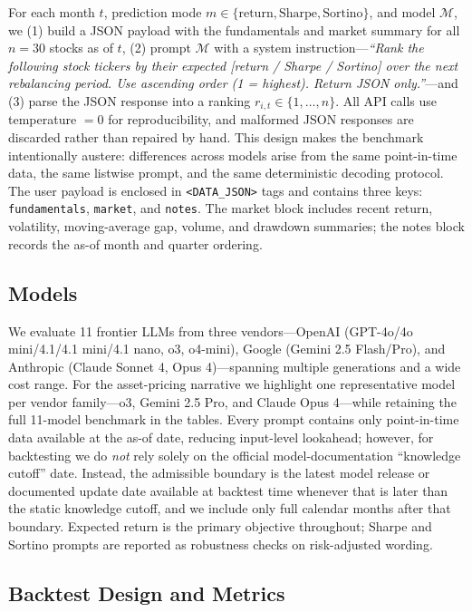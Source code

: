 For each month $t$, prediction mode $m \in \{\text{return}, \text{Sharpe}, \text{Sortino}\}$, and model $\mathcal{M}$, we (1) build a JSON payload with the fundamentals and market summary for all $n=30$ stocks as of $t$, (2) prompt $\mathcal{M}$ with a system instruction---\emph{``Rank the following stock tickers by their expected [return / Sharpe / Sortino] over the next rebalancing period. Use ascending order (1 = highest). Return JSON only.''}---and (3) parse the JSON response into a ranking $r_{i,t} \in \{1, \ldots, n\}$.
All API calls use temperature $=0$ for reproducibility, and malformed JSON responses are discarded rather than repaired by hand.
This design makes the benchmark intentionally austere: differences across models arise from the same point-in-time data, the same listwise prompt, and the same deterministic decoding protocol.
The user payload is enclosed in \texttt{<DATA\_JSON>} tags and contains three keys: \texttt{fundamentals}, \texttt{market}, and \texttt{notes}.
The market block includes recent return, volatility, moving-average gap, volume, and drawdown summaries; the notes block records the as-of month and quarter ordering.

\subsection{Models}

We evaluate 11 frontier LLMs from three vendors---OpenAI (GPT-4o/4o mini/4.1/4.1 mini/4.1 nano, o3, o4-mini), Google (Gemini 2.5 Flash/Pro), and Anthropic (Claude Sonnet 4, Opus 4)---spanning multiple generations and a wide cost range.
For the asset-pricing narrative we highlight one representative model per vendor family---o3, Gemini 2.5 Pro, and Claude Opus 4---while retaining the full 11-model benchmark in the tables.
Every prompt contains only point-in-time data available at the as-of date, reducing input-level lookahead; however, for backtesting we do \emph{not} rely solely on the official model-documentation ``knowledge cutoff'' date.
Instead, the admissible boundary is the latest model release or documented update date available at backtest time whenever that is later than the static knowledge cutoff, and we include only full calendar months after that boundary.
Expected return is the primary objective throughout; Sharpe and Sortino prompts are reported as robustness checks on risk-adjusted wording.

\subsection{Backtest Design and Metrics}

